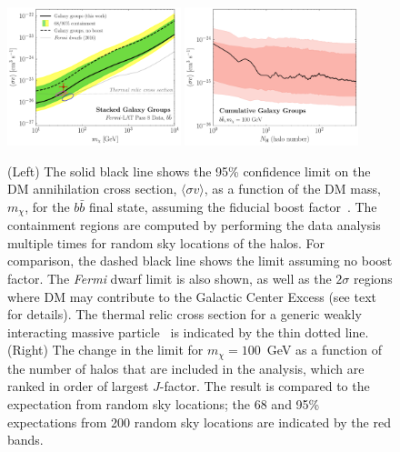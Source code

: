 \begin{figure}[t]
\centering
\includegraphics[width=0.45\textwidth]{ch-clusters/plots/bounds.pdf} \hspace{4mm}
\includegraphics[width=0.45\textwidth]{ch-clusters/plots/elephant.pdf}
\caption{(Left) The solid black line shows the 95\% confidence limit on the DM annihilation cross section, $\langle \sigma v \rangle$, as a function of the DM mass, $m_\chi$, for the $b \bar b$ final state, assuming the fiducial boost factor~\cite{Bartels:2015uba}. The containment regions are computed by performing the data analysis multiple times for random sky locations of the halos.  For comparison, the dashed black line shows the limit assuming no boost factor.  The {\it Fermi} dwarf limit is also shown, as well as the $2$$\sigma$ regions where DM may contribute to the Galactic Center Excess (see text for details).  The thermal relic cross section for a generic weakly interacting massive particle~\cite{Steigman:2012nb} is indicated by the thin dotted line.   (Right) The change in the limit for $m_\chi = 100$~GeV as a function of the number of halos that are included in the analysis, which are ranked in order of largest $J$-factor.  The result is compared to the expectation from random sky locations; the 68 and 95\% expectations from 200 random sky locations are indicated by the red bands.}
\label{fig:bounds}
\end{figure}

